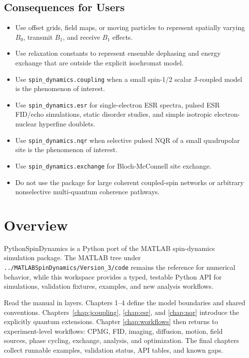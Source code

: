 \documentclass[11pt,oneside]{report}
\newcommand{\code}[1]{\texttt{#1}}
\begin{document}
\section{Consequences for Users}

\begin{itemize}
  \item Use offset grids, field maps, or moving particles to represent
  spatially varying \(B_0\), transmit \(B_1\), and receive \(B_1\) effects.
  \item Use relaxation constants to represent ensemble dephasing and energy
  exchange that are outside the explicit isochromat model.
  \item Use \code{spin\_dynamics.coupling} when a small spin-1/2 scalar
  J-coupled model is the phenomenon of interest.
  \item Use \code{spin\_dynamics.esr} for single-electron ESR spectra, pulsed
  ESR FID/echo simulations, static disorder studies, and simple isotropic
  electron-nuclear hyperfine doublets.
  \item Use \code{spin\_dynamics.nqr} when selective pulsed NQR of a small
  quadrupolar site is the phenomenon of interest.
  \item Use \code{spin\_dynamics.exchange} for Bloch-McConnell site exchange.
  \item Do not use the package for large coherent coupled-spin networks or
  arbitrary nonselective multi-quantum coherence pathways.
\end{itemize}

\chapter{Overview}

PythonSpinDynamics is a Python port of the MATLAB spin-dynamics simulation
package. The MATLAB tree under \code{../MATLABSpinDynamics/Version\_3/code}
remains the reference for numerical behavior, while this workspace provides a
typed, testable Python API for simulations, validation fixtures, examples, and
new analysis workflows.

Read the manual in layers. Chapters 1--4 define the model boundaries and shared
conventions. Chapters~\ref{chap:jcoupling}, \ref{chap:esr}, and
\ref{chap:nqr} introduce the explicitly quantum extensions. Chapter
\ref{chap:workflows} then returns to experiment-level workflows: CPMG, FID,
imaging, diffusion, motion, field sources, phase cycling, exchange, analysis,
and optimization. The final chapters collect runnable examples, validation
status, API tables, and known gaps.
\end{document}
